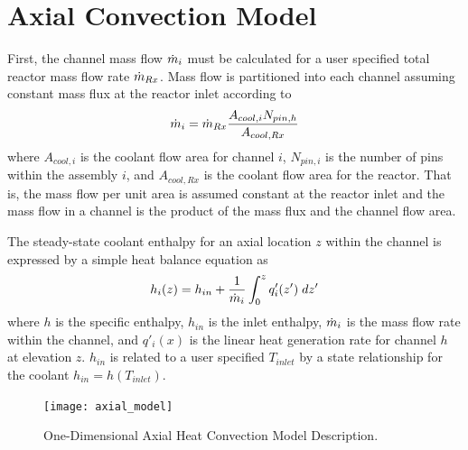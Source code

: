 \section{Axial Convection Model}
  \label{sec:axial_convection_model}
  First, the channel mass flow $\dot{m}_i$ must be calculated for a user specified
  total reactor mass flow rate $\dot{m}_{Rx}$.  Mass flow is partitioned into each
  channel assuming constant mass flux at the reactor inlet according to 
  \begin{equation}
    \label{eq:mass_flow_split}
    \dot{m}_i = \dot{m}_{Rx} \frac{A_{cool,i}N_{pin,h}}{A_{cool,Rx}}
  \end{equation}
  where $A_{cool,i}$ is the coolant flow area for channel $i$, $N_{pin,i}$ is
  the number of pins within the assembly $i$, and $A_{cool,Rx}$
  is the coolant flow area for the reactor.  That is, the mass 
  flow per unit area is assumed constant at the reactor inlet and the mass flow 
  in a channel is the product of the mass flux and the channel flow area. 
  
  The steady-state coolant enthalpy for an axial location $z$ within the channel
  is expressed by a simple heat balance equation as
  \begin{equation}
    \label{eq:continuous_heat_balance}
    h_i(z) = h_{in} + \frac{1}{\dot{m}_i} \int_0^z q'_i(z') \; dz'
  \end{equation}
  where $h$ is the specific enthalpy, $h_{in}$ is the inlet enthalpy, $\dot{m}_i$
  is the mass flow rate within the channel, and $q'_i(x)$ is the linear heat 
  generation rate for channel $h$ at elevation $z$. $h_{in}$ is related to a
  user specified 
  $T_{inlet}$ by a state relationship for the coolant $h_{in} = h(T_{inlet})$.
  
  \begin{figure}
    \centering
    \texttt{[image: axial\_model]}
    \caption{One-Dimensional Axial Heat Convection Model Description.}
    \label{fig:axial_model}
  \end{figure}
  
